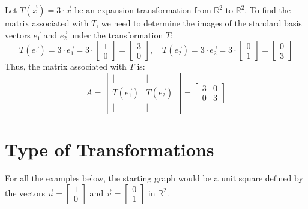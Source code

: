 \begin{eg}
    Let $T(\vec{x}) = 3 \cdot \vec{x}$ be an expansion transformation from $\mathbb{R}^2$ to $\mathbb{R}^2$. To find the matrix associated with $T$, we need to determine the images of the standard basis vectors $\vec{e_1}$ and $\vec{e_2}$ under the transformation $T$:
    \[
        T(\vec{e_1}) = 3 \cdot \vec{e_1} = 3 \cdot \begin{bmatrix} 1 \\ 0 \end{bmatrix} = \begin{bmatrix} 3 \\ 0 \end{bmatrix}, \quad T(\vec{e_2}) = 3 \cdot \vec{e_2} = 3 \cdot \begin{bmatrix} 0 \\ 1 \end{bmatrix} = \begin{bmatrix} 0 \\ 3 \end{bmatrix}
    \]
    Thus, the matrix associated with $T$ is:
    \[
        A = \begin{bmatrix} | & | \\ T(\vec{e_1}) & T(\vec{e_2}) \\ | & | \end{bmatrix} = \begin{bmatrix} 3 & 0 \\ 0 & 3 \end{bmatrix}
    \]
\end{eg}

\section{Type of Transformations}
For all the examples below, the starting graph would be a unit square defined by the vectors $\vec{u} = \begin{bmatrix} 1 \\ 0 \end{bmatrix}$ and $\vec{v} = \begin{bmatrix} 0 \\ 1 \end{bmatrix}$ in $\mathbb{R}^2$.
\begin{center}
\end{center}

